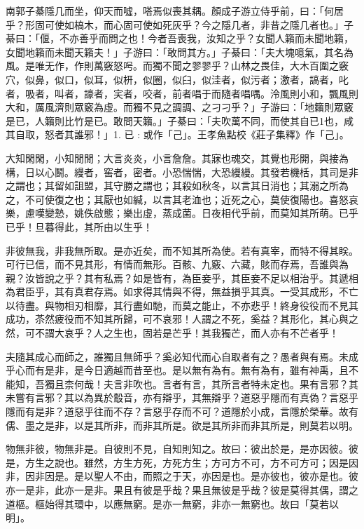 
\begin{pinyinscope}
南郭子綦隱几而坐，仰天而噓，嗒焉似喪其耦。顏成子游立侍乎前，曰：「何居乎？形固可使如槁木，而心固可使如死灰乎？今之隱几者，非昔之隱几者也。」子綦曰：「偃，不亦善乎而問之也！今者吾喪我，汝知之乎？女聞人籟而未聞地籟，女聞地籟而未聞天籟夫！」子游曰：「敢問其方。」子綦曰：「夫大塊噫氣，其名為風。是唯无作，作則萬竅怒呺。而獨不聞之翏翏乎？山林之畏佳，大木百圍之竅穴，似鼻，似口，似耳，似枅，似圈，似臼，似洼者，似污者；激者，謞者，叱者，吸者，叫者，譹者，宎者，咬者，前者唱于而隨者唱喁。泠風則小和，飄風則大和，厲風濟則眾竅為虛。而獨不見之調調、之刁刁乎？」子游曰：「地籟則眾竅是已，人籟則比竹是已。敢問天籟。」子綦曰：「夫吹萬不同，而使其自已1也，咸其自取，怒者其誰邪！」1. 已 : 或作「己」。王孝魚點校《莊子集釋》作「己」。

大知閑閑，小知閒閒；大言炎炎，小言詹詹。其寐也魂交，其覺也形開，與接為構，日以心鬭。縵者，窖者，密者。小恐惴惴，大恐縵縵。其發若機栝，其司是非之謂也；其留如詛盟，其守勝之謂也；其殺如秋冬，以言其日消也；其溺之所為之，不可使復之也；其厭也如緘，以言其老洫也；近死之心，莫使復陽也。喜怒哀樂，慮嘆變慹，姚佚啟態；樂出虛，蒸成菌。日夜相代乎前，而莫知其所萌。已乎已乎！旦暮得此，其所由以生乎！

非彼無我，非我無所取。是亦近矣，而不知其所為使。若有真宰，而特不得其眹。可行已信，而不見其形，有情而無形。百骸、九竅、六藏，賅而存焉，吾誰與為親？汝皆說之乎？其有私焉？如是皆有，為臣妾乎，其臣妾不足以相治乎。其遞相為君臣乎，其有真君存焉。如求得其情與不得，無益損乎其真。一受其成形，不亡以待盡。與物相刃相靡，其行盡如馳，而莫之能止，不亦悲乎！終身役役而不見其成功，苶然疲役而不知其所歸，可不哀邪！人謂之不死，奚益？其形化，其心與之然，可不謂大哀乎？人之生也，固若是芒乎！其我獨芒，而人亦有不芒者乎！

夫隨其成心而師之，誰獨且無師乎？奚必知代而心自取者有之？愚者與有焉。未成乎心而有是非，是今日適越而昔至也。是以無有為有。無有為有，雖有神禹，且不能知，吾獨且柰何哉！夫言非吹也。言者有言，其所言者特未定也。果有言邪？其未嘗有言邪？其以為異於鷇音，亦有辯乎，其無辯乎？道惡乎隱而有真偽？言惡乎隱而有是非？道惡乎往而不存？言惡乎存而不可？道隱於小成，言隱於榮華。故有儒、墨之是非，以是其所非，而非其所是。欲是其所非而非其所是，則莫若以明。

物無非彼，物無非是。自彼則不見，自知則知之。故曰：彼出於是，是亦因彼。彼是，方生之說也。雖然，方生方死，方死方生；方可方不可，方不可方可；因是因非，因非因是。是以聖人不由，而照之于天，亦因是也。是亦彼也，彼亦是也。彼亦一是非，此亦一是非。果且有彼是乎哉？果且無彼是乎哉？彼是莫得其偶，謂之道樞。樞始得其環中，以應無窮。是亦一無窮，非亦一無窮也。故曰「莫若以明」。


\end{pinyinscope}
